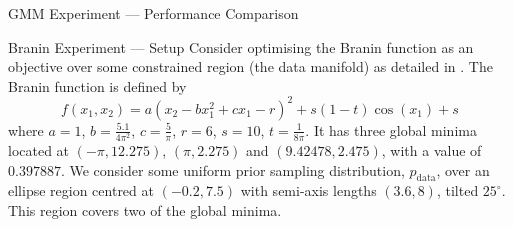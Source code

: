 \documentclass{beamer}
\begin{document}
    \begin{frame}{GMM Experiment --- Performance Comparison}
        \begin{table}[t]
            \centering
            \caption{Sliced-Wasserstein distances of samples from particle samples.}
        \end{table}
    \end{frame}

    \begin{frame}{Branin Experiment --- Setup}
        Consider optimising the Branin function as an objective over
        some constrained region (the data manifold) as detailed in
        \textcite{kongDiffusionModelsConstrained2024}. The Branin function is defined by
        \begin{equation*}
            f(x_1, x_2) = a(x_2 - bx_1^2 + cx_1 - r)^2 + s(1-t)\cos(x_1) + s
        \end{equation*}
        where $a=1$, $b = \frac{5.1}{4\pi^2}$, $c=\frac{5}{\pi}$, $r=6$, $s=10$, $t=\frac{1}{8\pi}$.
        It has three global minima located at $(-\pi, 12.275)$, $(\pi, 2.275)$ and $(9.42478, 2.475)$,
        with a value of $0.397887$. We consider some uniform prior sampling distribution, $p_{\text{data}}$,
        over an ellipse region centred at $(-0.2, 7.5)$ with semi-axis lengths $(3.6, 8)$, tilted
        $25^\circ$. This region covers two of the global minima.
    \end{frame}
\end{document}
